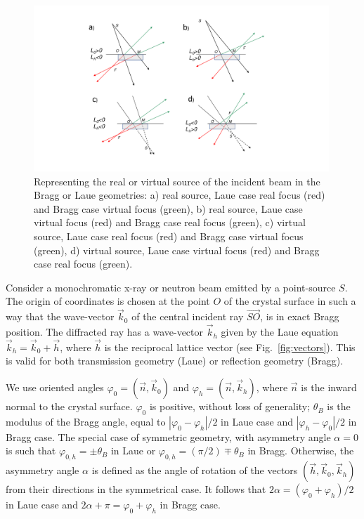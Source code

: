 \documentclass[preprint]{iucr}              %
\newcommand{\inblue}[1]{{\color{blue}#1}}
\begin{document}
\begin{figure}
\label{fig:geometries}
\caption{Representing the real or virtual source of the incident beam in the Bragg or Laue geometries:
a) real source, Laue case real focus (red) and Bragg case virtual focus (green),
b) real source, Laue case virtual focus (red) and Bragg case real focus (green),
c) virtual source, Laue case real focus (red) and Bragg case virtual focus (green),  
d) virtual source, Laue case virtual focus (red) and Bragg case real focus (green).
}
\includegraphics[width=0.99\textwidth,trim=5cm 2cm 7cm 2cm,clip=true]{fig_geometries.pdf}
\end{figure}

Consider a monochromatic x-ray or neutron beam emitted by a point-source $S$. The origin of coordinates is chosen at the point $O$ of the crystal surface in such a way that the wave-vector  ${\vec k_0}$ of the \inblue{central} incident ray $\vec{SO}$, is in exact Bragg  position. The diffracted ray has a wave-vector $\vec k_h$ given by the Laue equation $\vec k_h = \vec k_0 + \vec h$, where $\vec h$ is the reciprocal lattice vector (see Fig.~\ref{fig:vectors}). This is valid for both transmission geometry (Laue) or reflection geometry (Bragg). 

We use oriented angles $\varphi_0 = (\vec n, \vec k_0)$ and $\varphi_h = (\vec n, \vec k_h)$, where $\vec n$ is the inward normal to the crystal surface. $\varphi_0$ is positive, without loss of generality; $\theta_B$ is the modulus of the Bragg angle, equal to $|\varphi_0-\varphi_h|/2$ in Laue case and  $|\varphi_h-\varphi_0|/2$ in Bragg case. The special case of symmetric geometry, with asymmetry angle $\alpha=0$ is such that $\varphi_{0,h}=\pm\theta_B$ in Laue or $\varphi_{0,h}=(\pi/2)\mp\theta_B$ in Bragg. Otherwise, the asymmetry angle $\alpha$ is defined as the angle of rotation of the vectors $(\vec h, \vec k_0, \vec k_h)$ from their directions in the symmetrical case. 
It follows that $2\alpha=(\varphi_0+\varphi_h)/2$ in Laue case and  $2\alpha+\pi=\varphi_0+\varphi_h$ in Bragg case.
\end{document}
